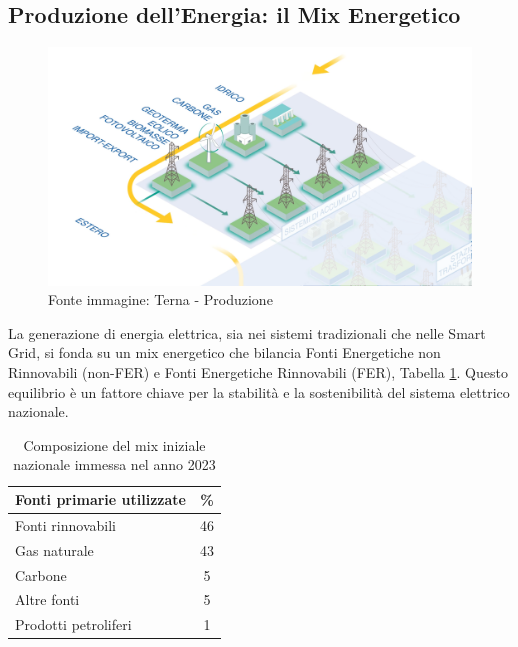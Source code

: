 \subsection{Produzione dell'Energia: il Mix Energetico}

\begin{figure}[h!]
    \centering
    \includegraphics[width=0.45\linewidth]{img/Terna-Produzione.png}
    \caption{Fonte immagine: Terna - Produzione}
\end{figure}


La generazione di energia elettrica, sia nei sistemi tradizionali che nelle Smart Grid, si fonda su un mix energetico che bilancia Fonti Energetiche non Rinnovabili (non-FER) e Fonti Energetiche Rinnovabili (FER), Tabella \ref{tab:GSE-mix-nazionale-2023}. Questo equilibrio è un fattore chiave per la stabilità e la sostenibilità del sistema elettrico nazionale.


\begin{table}[h!]
    \renewcommand{\arraystretch}{1.4}
    \centering
    \begin{tabular}{lc}
         \hline
         \textbf{Fonti primarie utilizzate}	& \textbf{\%} \\
         \hline
         Fonti rinnovabili & 46 \\
         Gas naturale& 43 \\
         Carbone& 5 \\
         Altre fonti & 5 \\
         Prodotti petroliferi& 1 \\
         \hline
    \end{tabular}
    \caption{Composizione del mix iniziale nazionale immessa nel anno 2023 \cite{GSE}}
    \label{tab:GSE-mix-nazionale-2023}
\end{table}


